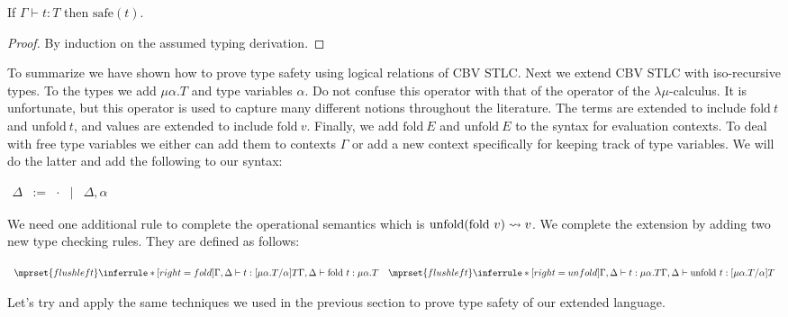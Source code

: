 \begin{thm}
  \label{corollary:type_safety}
  If $\Gamma \vdash t : T$ then $\text{safe}(t)$.
\end{thm}
\begin{proof}
  By induction on the assumed typing derivation.
\end{proof}
To summarize we have shown how to prove type safety using logical
relations of CBV STLC.  Next we extend CBV STLC with iso-recursive
types.  To the types we add $\mu \alpha . T$ and type variables
$\alpha$.  Do not confuse this operator with that of the operator of
the $\lambda\mu$-calculus.  It is unfortunate, but this operator is used to
capture many different notions throughout the literature.  The terms
are extended to include $\text{fold}\ t$ and $\text{unfold}\ t$, and
values are extended to include $\text{fold}\ v$.  Finally, we add
$\text{fold}\ E$ and $\text{unfold}\ E$ to the syntax for evaluation
contexts.  To deal with free type variables we either can add them to
contexts $\Gamma$ or add a new context specifically for keeping track
of type variables.  We will do the latter and add the following to our
syntax:
\begin{center}
  \begin{math}
    \begin{array}{lllll}
      \Delta & := & \cdot & | & \Delta,\alpha
    \end{array}
  \end{math}
\end{center}
We need one additional rule to complete the operational semantics which is 
$\text{unfold}(\text{fold}\ v) \rightsquigarrow v$.  We complete the extension by adding
two new type checking rules.  They are defined as follows: 
\begin{center}
  \begin{math}
    \begin{array}{lll}
      $$\mprset{flushleft}
      \inferrule* [right=fold] {
        \Gamma,\Delta \vdash t : [\mu \alpha.T/\alpha]T
      }{\Gamma,\Delta \vdash \text{fold}\ t:\mu \alpha.T}
      &
      $$\mprset{flushleft}
      \inferrule* [right=unfold] {
        \Gamma,\Delta \vdash t : \mu \alpha.T
      }{\Gamma,\Delta \vdash \text{unfold}\ t:[\mu \alpha.T/\alpha]T}
    \end{array}
  \end{math}
\end{center}
Let's try and apply the same techniques we used in the previous section to prove
type safety of our extended language.

